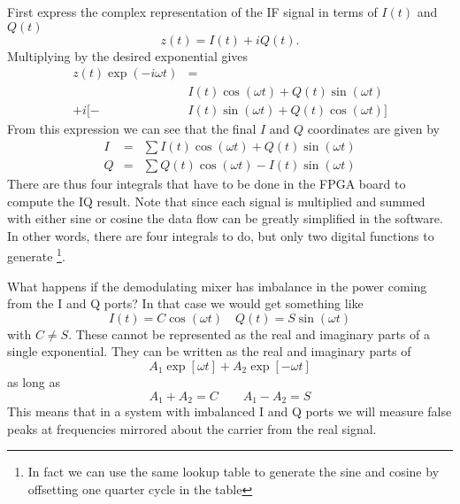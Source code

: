 First express the complex representation of the IF signal in terms of $I(t)$ and $Q(t)$ \begin{equation}
z(t) = I(t) + iQ(t). \end{equation}
Multiplying by the desired exponential gives \begin{align}
z(t) \exp \left(-i \omega t \right) &= \nonumber \\
        & I(t) \cos (\omega t) + Q(t) \sin (\omega t) \nonumber \\
+ i [ - & I(t) \sin (\omega t) + Q(t) \cos (\omega t) ] \end{align}
From this expression we can see that the final $I$ and $Q$ coordinates are given by \begin{eqnarray}
I &=& \sum I(t)\cos(\omega t) + Q(t) \sin(\omega t) \\
Q &=& \sum Q(t)\cos(\omega t) - I(t) \sin(\omega t) \end{eqnarray}
There are thus four integrals that have to be done in the FPGA board to compute the IQ result. Note that since each signal is multiplied and summed with either sine or cosine the data flow can be greatly simplified in the software. In other words, there are four integrals to do, but only two digital functions to generate \footnote{In fact we can use the same lookup table to generate the sine and cosine by offsetting one quarter cycle in the table}.


What happens if the demodulating mixer has imbalance in the power coming from the I and Q ports? In that case we would get something like \begin{equation}
I(t) = C \cos (\omega t) \quad Q(t) = S \sin (\omega t) \end{equation}
with $C \neq S$. These cannot be represented as the real and imaginary parts of a single exponential. They can be written as the real and imaginary parts of \begin{equation}
A_1 \exp \left[ \omega t \right] + A_2 \exp \left[ -\omega t \right] \end{equation}
as long as \begin{equation}
A_1 + A_2 = C \qquad A_1 - A_2 = S \end{equation}
This means that in a system with imbalanced I and Q ports we will measure false peaks at frequencies mirrored about the carrier from the real signal.
